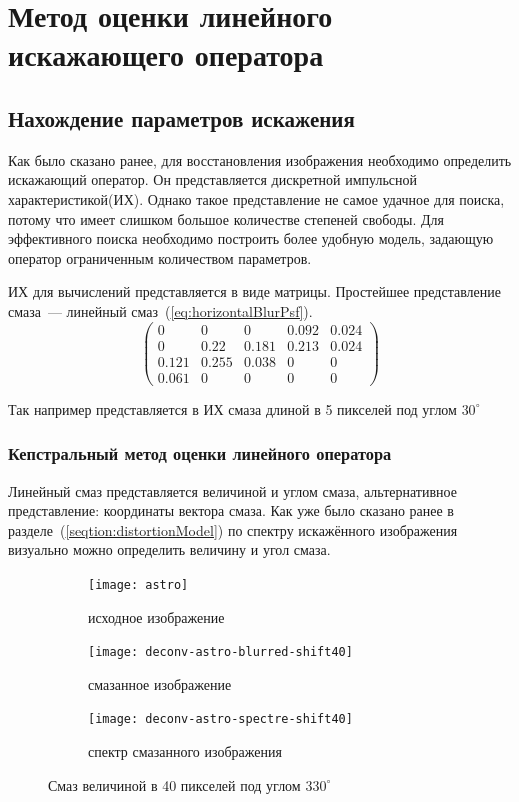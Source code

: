 \chapter{Метод оценки линейного искажающего оператора}
\section{Нахождение параметров искажения}
Как было сказано ранее, для восстановления изображения необходимо определить искажающий оператор. Он представляется дискретной импульсной характеристикой(ИХ). Однако такое представление не самое удачное для поиска, потому что имеет слишком большое количестве степеней свободы. Для эффективного поиска необходимо построить более удобную модель, задающую оператор ограниченным количеством параметров.

ИХ для вычислений представляется в виде матрицы. Простейшее представление смаза~--- линейный смаз~(\ref{eq:horizontalBlurPsf}).
\begin{equation}\label{eq:linearBlurArray}
\begin{pmatrix}
0 & 0 & 0 & 0.092 & 0.024\\
0 & 0.22 & 0.181 & 0.213 & 0.024\\
0.121 & 0.255 & 0.038 & 0 & 0\\
0.061 & 0 & 0 & 0 & 0
\end{pmatrix}
\end{equation}

Так например представляется в ИХ смаза длиной в 5 пикселей под углом $30^\circ$
\subsection{Кепстральный метод оценки линейного оператора}
Линейный смаз представляется величиной и углом смаза, альтернативное представление: координаты вектора смаза. Как уже было сказано ранее в разделе~(\ref{seqtion:distortionModel}) по спектру искажённого изображения визуально можно определить величину и угол смаза.
\begin{figure}[h!]
	\centering
	\begin{subfigure}[t]{0.3\textwidth}
		\texttt{[image: astro]}
		\caption{исходное изображение}
	\end{subfigure}
	\hfill
	\begin{subfigure}[t]{0.3\textwidth}
		\texttt{[image: deconv-astro-blurred-shift40]}
		\caption{смазанное изображение}
		\label{fig:astroShift40}
	\end{subfigure}%
	\hfill
	\begin{subfigure}[t]{0.3\textwidth}
		\texttt{[image: deconv-astro-spectre-shift40]}
		\caption{спектр смазанного изображения}
		\label{fig:astroShift40Spectre}
	\end{subfigure}
	\caption{Смаз величиной в 40 пикселей под углом $330^{\circ}$}
	\label{fig:spectre}
\end{figure}

